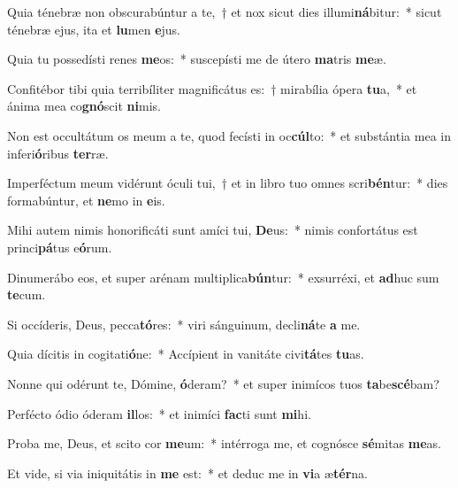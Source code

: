 \item Quia ténebræ non obscurabúntur a te,~† et nox sicut dies illumi\textbf{ná}bitur:~* sicut ténebræ ejus, ita et \textbf{lu}men \textbf{e}jus.
\item Quia tu possedísti renes \textbf{me}os:~* suscepísti me de útero \textbf{ma}tris \textbf{me}æ.
\item Confitébor tibi quia terribíliter magnificátus es:~† mirabília ópera \textbf{tu}a,~* et ánima mea co\textbf{gnó}scit \textbf{ni}mis.
\item Non est occultátum os meum a te, quod fecísti in oc\textbf{cúl}to:~* et substántia mea in inferi\textbf{ó}ribus \textbf{ter}ræ.
\item Imperféctum meum vidérunt óculi tui,~† et in libro tuo omnes scri\textbf{bén}tur:~* dies formabúntur, et \textbf{ne}mo in \textbf{e}is.
\item Mihi autem nimis honorificáti sunt amíci tui, \textbf{De}us:~* nimis confortátus est princi\textbf{pá}tus e\textbf{ó}rum.
\item Dinumerábo eos, et super arénam multiplica\textbf{bún}tur:~* exsurréxi, et \textbf{ad}huc sum \textbf{te}cum.
\item Si occíderis, Deus, pecca\textbf{tó}res:~* viri sánguinum, decli\textbf{ná}te \textbf{a} me.
\item Quia dícitis in cogitati\textbf{ó}ne:~* Accípient in vanitáte civi\textbf{tá}tes \textbf{tu}as.
\item Nonne qui odérunt te, Dómine, \textbf{ó}deram?~* et super inimícos tuos \textbf{ta}be\textbf{scé}bam?
\item Perfécto ódio óderam \textbf{il}los:~* et inimíci \textbf{fac}ti sunt \textbf{mi}hi.
\item Proba me, Deus, et scito cor \textbf{me}um:~* intérroga me, et cognósce \textbf{sé}mitas \textbf{me}as.
\item Et vide, si via iniquitátis in \textbf{me} est:~* et deduc me in \textbf{vi}a æ\textbf{tér}na.
